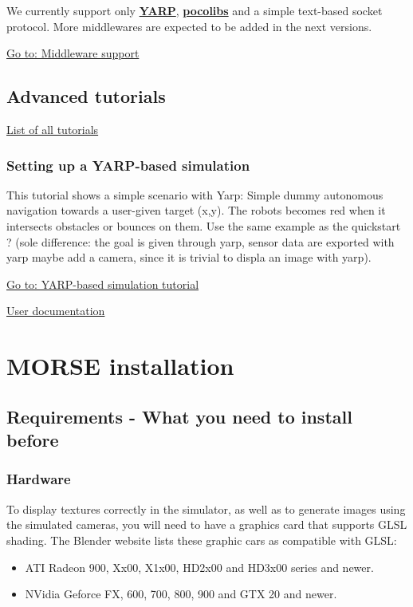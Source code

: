 \documentclass[twoside,a4paper,10pt]{report}
\newcommand{\dokutitlelevelone}[1]{\chapter{#1}}
\newcommand{\dokutitleleveltwo}[1]{\section{#1}}
\newcommand{\dokutitleleveltree}[1]{\subsection{#1}}
\newcommand{\dokubold}[1]{\textbf{#1}}
\newcommand{\dokuitem}{\item}
\newcommand{\dokuquoting}{\textbar}
\begin{document}
We currently support only \dokubold{\href{http://eris.liralab.it/yarp/}{ YARP}}, 
\dokubold{\href{https://softs.laas.fr/openrobots/wiki/pocolibs}{pocolibs}} and a simple 
text-based socket protocol. More middlewares are expected to be added in the 
next versions.

\hyperref[9a05db9c4b60b0527010fd997682f523]{ Go to: Middleware support}


\dokutitleleveltwo{Advanced tutorials}
\label{1db3103f04a8f50e1168ef3c23748f71}%

\hyperref[1db3103f04a8f50e1168ef3c23748f71]{ List of all tutorials}


\dokutitleleveltree{Setting up a YARP-based simulation}
\label{a3bba0b321b28de69351875f85d854db}%

This tutorial shows a simple scenario with Yarp: Simple dummy autonomous navigation towards a user-given target (x,y). 
The robots becomes red when it intersects obstacles or bounces on them. Use the same example as the quickstart ? 
(sole difference: the goal is given through yarp, sensor data are exported with yarp  maybe add a camera, since it is trivial to displa an image with yarp).

\hyperref[1dd029a60f7f3dd1deaf993ce4538edf]{ Go to: YARP-based simulation tutorial}

{\dokuquoting}{\dokuquoting} \hyperref[a80da1282f2c775bbc5f2c92c836968b]{ User documentation}


\dokutitlelevelone{MORSE installation}
\label{1d96fd68defedd8a755f2a95c80e618f}%
\label{ea09bb364ef1bffd889e76b7a59035fc}%

\dokutitleleveltwo{Requirements - What you need to install before}
\label{27060cbab4a02c4805c03a15b2aad7d7}%

\dokutitleleveltree{Hardware}
\label{3ca14c518d1bf901acc339e7c9cd6d7f}%

To display textures correctly in the simulator, as well as to generate images using the simulated cameras, you will need to have a graphics card that supports GLSL shading. The Blender website lists these graphic cars as compatible with GLSL:


\begin{itemize}
\dokuitem  ATI Radeon 9{\texttimes}00, Xx00, X1x00, HD2x00 and HD3x00 series and newer.
\dokuitem  NVidia Geforce FX, 6{\texttimes}00, 7{\texttimes}00, 8{\texttimes}00, 9{\texttimes}00 and GTX 2{\texttimes}0 and newer.
\end{itemize}
\end{document}
